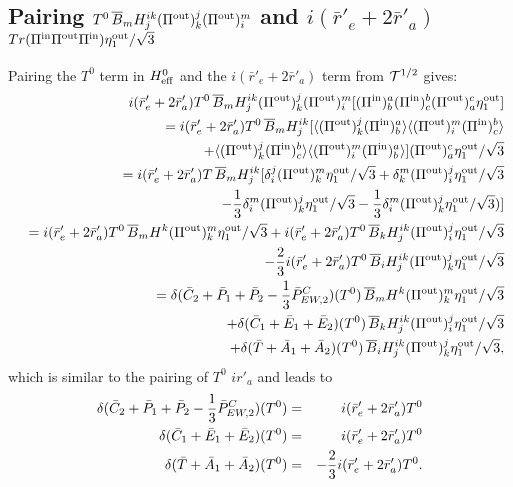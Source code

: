 \documentclass[aps,preprint,floats,epsf,epsfig,nofootinbib,letter]{revtex4}
\newcommand{\be}{\begin{eqnarray}}
\newcommand{\en}{\end{eqnarray}}
\newcommand{\T}{{\cal T}}
\newcommand{\la}{{\langle}}
\newcommand{\ra}{{\rangle}}
\newcommand{\non}{{\nonumber}}
\begin{document}
\subsection{Pairing $T^0\, \overline B_m H^{ik}_j (\Pi^{\rm out})^j_k (\Pi^{\rm out})^m_i$ and 
$i(\bar r'_e+2\bar r'_a)$
$Tr(\Pi^{\rm in}\Pi^{\rm out}\Pi^{\rm in})\eta^{\rm out}_1/\sqrt3$}
Pairing the $T^0$ term in $H^0_{\rm eff}$ and the $i(\bar r'_e+2\bar r'_a)$ term from $\T^{1/2}$ gives:
\be
&&
\hspace{-1cm}
 i(\bar r'_e+2\bar r'_a) T^0\, \overline B_m H^{ik}_j (\Pi^{\rm out})^j_k (\Pi^{\rm out})^m_i 
[(\Pi^{\rm in})^a_b(\Pi^{\rm in})^b_c(\Pi^{\rm out})^c_a\eta^{\rm out}_1]
\non\\
&&=i(\bar r'_e+2\bar r'_a) T^0\, \overline B_m H^{ik}_j 
[\la (\Pi^{\rm out})^j_k (\Pi^{\rm in})^a_b\ra
\la (\Pi^{\rm out})^m_i (\Pi^{\rm in})^b_c\ra
\non\\
&&\quad
+
\la (\Pi^{\rm out})^j_k (\Pi^{\rm in})^b_c\ra
\la (\Pi^{\rm out})^m_i (\Pi^{\rm in})^a_b\ra]
(\Pi^{\rm out})^c_a\eta^{\rm out}_1/\sqrt3
\non\\
&&=i(\bar r'_e+2\bar r'_a) T\, \overline B_m H^{ik}_j 
[\delta^j_i(\Pi^{\rm out})^m_k\eta^{\rm out}_1/\sqrt3+
\delta^m_k(\Pi^{\rm out})^j_i\eta^{\rm out}_1/\sqrt3
\non\\
&&\quad
-\frac{1}{3}\delta^m_i  (\Pi^{\rm out})^j_k\eta^{\rm out}_1/\sqrt3
-\frac{1}{3}\delta^m_i (\Pi^{\rm out})^j_k\eta^{\rm out}_1/\sqrt3)]
\non\\
&&=i(\bar r'_e+2\bar r'_a) T^0\,\overline B_m H^k (\Pi^{\rm out})^m_k\eta^{\rm out}_1/\sqrt3
      +i(\bar r'_e+2\bar r'_a) T^0\,\overline B_k H^{ik}_j (\Pi^{\rm out})^j_i\eta^{\rm out}_1/\sqrt3
      \non\\
&&\quad
      -\frac{2}{3}i(\bar r'_e+2\bar r'_a)T^0\,\overline B_i H^{ik}_j (\Pi^{\rm out})^j_k\eta^{\rm out}_1/\sqrt3
\non\\
&&=\delta (\bar C_2+\bar P_1+\bar P_2-\frac{1}{3}\bar P^C_{EW,2})(T^0)\,\overline B_m H^k (\Pi^{\rm out})^m_k\eta^{\rm out}_1/\sqrt3
\non\\
&&\quad
      +\delta (\bar C_1+\bar E_1+\bar E_2)(T^0)\,\overline B_k H^{ik}_j (\Pi^{\rm out})^j_i\eta^{\rm out}_1/\sqrt3
      \non\\
&&\quad
      +\delta (\bar T+\bar A_1+\bar A_2)(T^0)\,\overline B_i H^{ik}_j (\Pi^{\rm out})^j_k\eta^{\rm out}_1/\sqrt3,
\en
which is similar to the pairing of $T^0$ $ir'_a$ and leads to
\be
\delta (\bar C_2+\bar P_1+\bar P_2-\frac{1}{3}\bar P^C_{EW,2})(T^0)&=&i(\bar r'_e+2\bar r'_a) T^0
\non\\
\delta (\bar C_1+\bar E_1+\bar E_2)(T^0)&=&i(\bar r'_e+2\bar r'_a) T^0
\non\\
\delta (\bar T+\bar A_1+\bar A_2)(T^0)&=&-\frac{2}{3}i(\bar r'_e+2\bar r'_a) T^0.
\en
\end{document}
